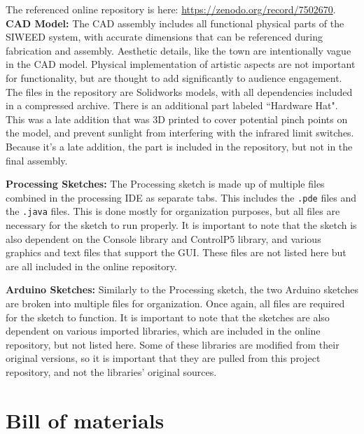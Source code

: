 \documentclass[11pt, letterpaper]{article}
\begin{document}
\newline
The referenced online repository is here: \href{https://zenodo.org/record/7502670}{https://zenodo.org/record/7502670}.
\newline
\textbf{CAD Model:}
The CAD assembly includes all functional physical parts of the SIWEED system, with accurate dimensions that can be referenced during fabrication and assembly.
Aesthetic details, like the town are intentionally vague in the CAD model.
Physical implementation of artistic aspects are not important for functionality, but are thought to add significantly to audience engagement.
The files in the repository are Solidworks models, with all dependencies included in a compressed archive.
There is an additional part labeled ``Hardware Hat". 
This was a late addition that was 3D printed to cover potential pinch points on the model, and prevent sunlight from interfering with the infrared limit switches. 
Because it's a late addition, the part is included in the repository, but not in the final assembly. 
\par


\textbf{Processing Sketches:}
The Processing sketch is made up of multiple files combined in the processing IDE as separate tabs. 
This includes the \texttt{.pde} files and the \texttt{.java} files.
This is done mostly for organization purposes, but all files are necessary for the sketch to run properly. 
It is important to note that the sketch is also dependent on the Console library and ControlP5 library, and various graphics and text files that support the GUI. 
These files are not listed here but are all included in the online repository.
\par


\textbf{Arduino Sketches:}
Similarly to the Processing sketch, the two Arduino sketches are broken into multiple files for organization.
Once again, all files are required for the sketch to function.
It is important to note that the sketches are also dependent on various imported libraries, which are included in the online repository, but not listed here.
Some of these libraries are modified from their original versions, so it is important that they are pulled from this project repository, and not the libraries' original sources.

\section{Bill of materials}
\end{document}
